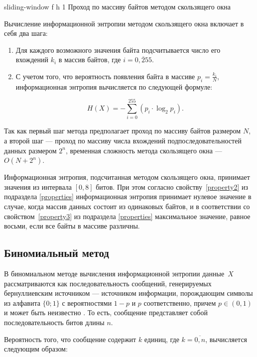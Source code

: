     {sliding-window}
    {f}
    {h}
    {1\textwidth}
    {Проход по массиву байтов методом скользящего окна}
    
Вычисление информационной энтропии методом скользящего окна включает в себя два шага:

\begin{enumerate}
	\item Для каждого возможного значения байта подсчитывается число его вхождений $k_{i}$ в массив байтов, где $i = \overline{0, 255}$.
	\item С учетом того, что вероятность появления байта в массиве $p_{i} = \frac{k_{i}}{N}$, информационная энтропия вычисляется по следующей формуле:
	
	\begin{equation}
		H(X) = -\sum_{i = 0}^{255} (p_{i} \cdot \log_{2}p_{i}).
	\end{equation}
\end{enumerate}

Так как первый шаг метода предполагает проход по массиву байтов размером $N$, а второй шаг --- проход по массиву числа вхождений подпоследовательностей данных размером $2^n$, временная сложность метода скользящего окна --- $O(N + 2^n)$. 

Информационная энтропия, подсчитанная методом скользящего окна, принимает значения из интервала $[0, 8]$ битов. При этом согласно свойству~\ref{property2} из подраздела \ref{properties} информационная энтропия принимает нулевое значение в случае, когда массив данных состоит из одинаковых байтов, и в соответствии со свойством~\ref{property3} из подраздела \ref{properties} максимальное значение, равное восьми, если все байты в массиве различны.

\subsection{Биномиальный метод}

В биномиальном методе вычисления информационной энтропии \cite{binomial-method} данные~$X$ рассматриваются как последовательность сообщений, генерируемых бернуллиевским источником --- источником информации, порождающим символы из алфавита $\{0; 1\}$ с вероятностями $1 - p$ и $p$ соответственно, причем $p \in (0, 1)$ и может быть неизвестно \cite{bernullie-source}. То есть, сообщение представляет собой последовательность битов длины $n$.

Вероятность того, что сообщение содержит $k$ единиц, где $k = \overline{0, n}$, вычисляется следующим образом:

